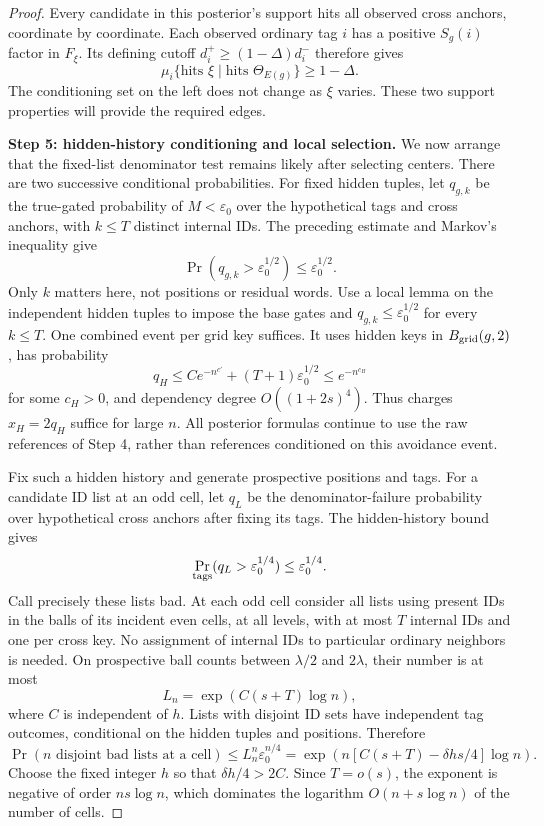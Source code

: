 \begin{proof}
Every candidate in this posterior's support hits all observed cross anchors, coordinate by coordinate. Each observed ordinary tag \(i\) has a positive \(S_g(i)\) factor in \(F_\xi\). Its defining cutoff \(d_i^+\ge(1-\Delta)d_i^-\) therefore gives
\[
 \mu_i\{\text{hits }\xi\mid
                  \text{hits }\Theta_{E(g)}\}\ge1-\Delta.
\]
The conditioning set on the left does not change as \(\xi\) varies. These two support properties will provide the required edges.

\noindent\textbf{Step 5: hidden-history conditioning and local selection.}\quad
We now arrange that the fixed-list denominator test remains likely after selecting centers. There are two successive conditional probabilities. For fixed hidden tuples, let \(q_{g,k}\) be the true-gated probability of \(M<\varepsilon_0\) over the hypothetical tags and cross anchors, with \(k\le T\) distinct internal IDs. The preceding estimate and Markov's inequality give
\[
 \Pr(q_{g,k}>\varepsilon_0^{1/2})
       \le\varepsilon_0^{1/2}.
\]
Only \(k\) matters here, not positions or residual words. Use a local lemma on the independent hidden tuples to impose the base gates and \(q_{g,k}\le\varepsilon_0^{1/2}\) for every \(k\le T\). One combined event per grid key suffices. It uses hidden keys in \(B_{\rm grid}(g,2)\), has probability
\[
 q_H\le C e^{-n^{c'}}+(T+1)\varepsilon_0^{1/2}
        \le e^{-n^{c_H}}
\]
for some \(c_H>0\), and dependency degree \(O((1+2s)^4)\). Thus charges \(x_H=2q_H\) suffice for large \(n\). All posterior formulas continue to use the raw references of Step 4, rather than references conditioned on this avoidance event.

Fix such a hidden history and generate prospective positions and tags. For a candidate ID list at an odd cell, let \(q_L\) be the denominator-failure probability over hypothetical cross anchors after fixing its tags. The hidden-history bound gives
\[
 \Pr_{\rm tags}(q_L>\varepsilon_0^{1/4})
       \le\varepsilon_0^{1/4}.
\]
Call precisely these lists bad. At each odd cell consider all lists using present IDs in the balls of its incident even cells, at all levels, with at most \(T\) internal IDs and one per cross key. No assignment of internal IDs to particular ordinary neighbors is needed. On prospective ball counts between \(\lambda/2\) and \(2\lambda\), their number is at most
\[
 L_n=\exp(C(s+T)\log n),
\]
where \(C\) is independent of \(h\). Lists with disjoint ID sets have independent tag outcomes, conditional on the hidden tuples and positions. Therefore
\[
 \Pr(\text{\(n\) disjoint bad lists at a cell})
 \le L_n^n\varepsilon_0^{n/4}
 =\exp\!\left(n[C(s+T)-\delta hs/4]\log n\right).
\]
Choose the fixed integer \(h\) so that \(\delta h/4>2C\). Since \(T=o(s)\), the exponent is negative of order \(ns\log n\), which dominates the logarithm \(O(n+s\log n)\) of the number of cells.


\end{proof}
